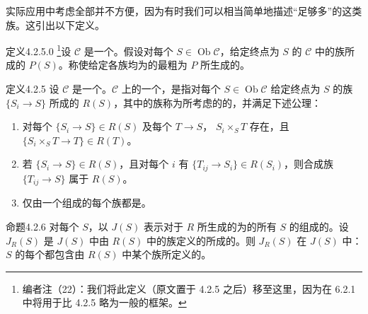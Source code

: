 实际应用中考虑全部并不方便，因为有时我们可以相当简单地描述“足够多”的这类族。这引出以下定义。
\begin{SGAresult}{定义}{4.2.5.0}
\footnote{编者注（22）：我们将此定义（原文置于 4.2.5 之后）移至这里，因为在 6.2.1 中将用于比 4.2.5 略为一般的框架。}设 $\mathcal C$ 是一个。假设对每个 $S\in\operatorname{Ob}\mathcal C$，给定终点为 $S$ 的 $\mathcal C$ 中的族所成的 $P(S)$。称使给定各族均为的最粗为 $P$ 所生成的。
\end{SGAresult}
\begin{SGAresult}{定义}{4.2.5}
设 $\mathcal C$ 是一个。$\mathcal C$ 上的一个，是指对每个 $S\in\operatorname{Ob}\mathcal C$ 给定终点为 $S$ 的族 $\{S_i\to S\}$ 所成的 $R(S)$，其中的族称为所考虑的的，并满足下述公理：
\begin{enumerate}
\item[（P 1）] 对每个 $\{S_i\to S\}\in R(S)$ 及每个 $T\to S$， $S_i\times_S T$ 存在，且 $\{S_i\times_S T\to T\}\in R(T)$。
\item[（P 2）] 若 $\{S_i\to S\}\in R(S)$，且对每个 $i$ 有 $\{T_{ij}\to S_i\}\in R(S_i)$，则合成族 $\{T_{ij}\to S\}$ 属于 $R(S)$。
\item[（P 3）] 仅由一个组成的每个族都是。
\end{enumerate}
\end{SGAresult}
\begin{SGAresult}{命题}{4.2.6}
对每个 $S$，以 $J(S)$ 表示对于 $R$ 所生成的为的所有 $S$ 的组成的。设 $J_R(S)$ 是 $J(S)$ 中由 $R(S)$ 中的族定义的所成的。则 $J_R(S)$ 在 $J(S)$ 中：$S$ 的每个都包含由 $R(S)$ 中某个族所定义的。
\end{SGAresult}
